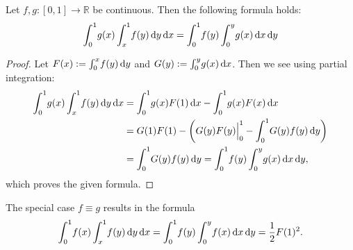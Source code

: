 \begin{Lemma}
    \label{lem:triangle-integration}
    Let $f,g\colon[0,1]\to\mathbb{R}$ be continuous. Then the following formula
    holds:
    \begin{align*}
        \Integ[1]{0}{x}{g(x)\Integ[1]{x}{y}{f(y)}} =
        \Integ[1]{0}{y}{f(y)\Integ[y]{0}{x}{g(x)}}
    \end{align*}
    \begin{proof}
        Let $F(x) := \Integ[x]{0}{y}{f(y)}$ and $G(y) := \Integ[y]{0}{x}{g(x)}$.
        Then we see using partial integration:
        \begin{align*}
            \Integ[1]{0}{x}{g(x)\Integ[1]{x}{y}{f(y)}} &=
            \Integ[1]{0}{x}{g(x)F(1)} - \Integ[1]{0}{x}{g(x)F(x)} \\
            &= G(1)F(1) - \left(\Bigl.G(y)F(y)\Bigr|_0^1 -
            \Integ[1]{0}{y}{G(y)f(y)}\right) \\
            &= \Integ[1]{0}{y}{G(y)f(y)} =
            \Integ[1]{0}{y}{f(y)\Integ[y]{0}{x}{g(x)}},
        \end{align*}
        which proves the given formula.
    \end{proof}
    \begin{Remark}
      The special case $f\equiv g$ results in the formula
      \begin{align*}
        \Integ[1]{0}{x}{f(x)\Integ[1]{x}{y}{f(y)}} = 
        \Integ[1]{0}{y}{f(y)\Integ[y]{0}{x}{f(x)}} = 
        \frac12 F(1)^2.
      \end{align*}
    \end{Remark}
\end{Lemma}

